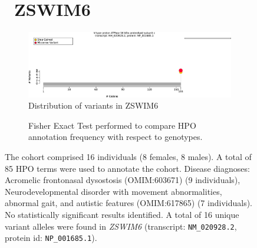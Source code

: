\begin{figure}[htbp]
\section*{ ZSWIM6}
\centering
\begin{subfigure}[b]{0.95\textwidth}
\centering
\includegraphics[width=\textwidth]{ img/ZSWIM6_protein_diagram.pdf} 
\captionsetup{justification=raggedright,singlelinecheck=false}
\caption{Distribution of variants in ZSWIM6}
\end{subfigure}

\vspace{2em}

\begin{subfigure}[b]{0.95\textwidth}
\centering
{}
\captionsetup{justification=raggedright,singlelinecheck=false}
\caption{Fisher Exact Test performed to compare HPO annotation frequency with respect to genotypes.}
\end{subfigure}

\vspace{2em}

\caption{The cohort comprised 16 individuals (8 females, 8 males). A total of 85 HPO terms were used to annotate the cohort. Disease diagnoses: Acromelic frontonasal dysostosis (OMIM:603671) (9 individuals), Neurodevelopmental disorder with movement abnormalities, abnormal gait, and autistic features (OMIM:617865) (7 individuals). No statistically significant results identified. A total of 16 unique variant alleles were found in \textit{ZSWIM6} (transcript: \texttt{NM\_020928.2}, protein id: \texttt{NP\_001685.1}).}
\end{figure}
